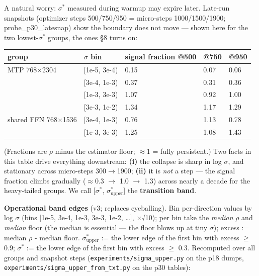 \documentclass[
]{article}
\newcounter{none} %
\begin{document}
A natural worry: \(\sigma^*\) measured during warmup may expire later.
Late-run snapshots (optimizer steps 500/750/950 = micro-steps
1000/1500/1900; probe\_p30\_latesnap) show the boundary does not move
--- shown here for the two lowest-\(\sigma^*\) groups, the ones §8 turns
on:

{\def\LTcaptype{none} %
\begin{longtable}[]{@{}lllll@{}}
\toprule\noalign{}
group & \(\sigma\) bin & signal fraction @500 & @750 & @950 \\
\midrule\noalign{}
\endhead
\bottomrule\noalign{}
\endlastfoot
MTP 768\(\times\){}2304 & {[}1e-5, 3e-4) & 0.15 & 0.07 & 0.06 \\
& {[}3e-4, 1e-3) & 0.37 & 0.31 & 0.36 \\
& {[}1e-3, 3e-3) & 1.07 & 0.92 & 1.00 \\
& {[}3e-3, 1e-2) & 1.34 & 1.17 & 1.29 \\
shared FFN 768\(\times\){}1536 & {[}3e-4, 1e-3) & 0.76 & 1.13 &
0.78 \\
& {[}1e-3, 3e-3) & 1.25 & 1.08 & 1.43 \\
\end{longtable}
}

(Fractions are \(\rho\) minus the estimator floor; \(\approx\){}1 =
fully persistent.) Two facts in this table drive everything downstream:
\textbf{(i)} the collapse is sharp in log \(\sigma\), and stationary
across micro-steps 300\(\to\){}1900; \textbf{(ii)} it is \emph{not} a
step --- the signal fraction climbs gradually (\(\approx\){}0.3
\(\to\) 1.0 \(\to\) 1.3) across nearly a decade for the heavy-tailed
groups. We call {[}\(\sigma^*\), \(\sigma^*_{\mathrm{upper}}\){]} the
\textbf{transition band}.

\textbf{Operational band edges} (v3; replaces eyeballing). Bin
per-direction values by log \(\sigma\) (bins {[}1e-5, 3e-4, 1e-3, 3e-3,
1e-2, \ldots{]}, \(\times\)√10); per bin take the \emph{median} \(\rho\)
and \emph{median} floor (the median is essential --- the floor blows up
at tiny \(\sigma\)); excess := median \(\rho\) - median floor.
\(\sigma^*_{\mathrm{upper}}\) := the lower edge of the first bin with
excess \(\geq\) 0.9; \(\sigma^*\) := the lower edge of the first bin
with excess \(\geq\) 0.3. Recomputed over all groups and snapshot steps
(\texttt{experiments/sigma\_upper.py} on the p18 dumps,
\texttt{experiments/sigma\_upper\_from\_txt.py} on the p30 tables):
\end{document}
